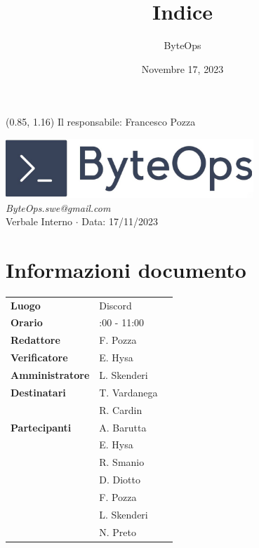 \documentclass{article}
\title{\textbf{\fontsize{28}{6}\selectfont Indice}}
\author{\fontsize{14}{6}\selectfont ByteOps}
\date{Novembre 17, 2023}
\begin{document}
\begin{textblock*}{\textwidth}(0.85\textwidth, 1.16\textheight)
    Il responsabile: Francesco Pozza
\end{textblock*}

\pagestyle{fancy}
\begin{center}
\includegraphics[width = 0.7\textwidth]{../../../Images/logo.png} \\
\vspace{0.2cm}
\textcolor[RGB]{60, 60, 60}{\textit{ByteOps.swe@gmail.com}} \\
\vspace{1cm}
\fontsize{16}{6}\selectfont Verbale Interno $\cdot$ Data: 17/11/2023 \\
\vspace{0.5cm}
\end{center}

\section*{Informazioni documento}
\def\arraystretch{1.2}
\begin{tabular}{>{\raggedleft\arraybackslash}p{}|>{\raggedright\arraybackslash}p{}c}
\hline
\addlinespace
\textbf{Luogo} & Discord \vspace{10pt} \\
\textbf{Orario} & 9:00 - 11:00 \vspace{10pt} \\
\textbf{Redattore} & F. Pozza \vspace{10pt} \\
\textbf{Verificatore} & E. Hysa \vspace{10pt} \\
\textbf{Amministratore} & L. Skenderi \vspace{10pt} \\
\textbf{Destinatari} & T. Vardanega \\ & R. Cardin \vspace{10pt} \\
\textbf{Partecipanti} & A. Barutta \\ & E. Hysa \\ & R. Smanio \\ & D. Diotto \\ & F. Pozza \\ & L. Skenderi \\ & N. Preto \vspace{10pt} \\
\end{tabular}
\pagebreak 
\end{document}
